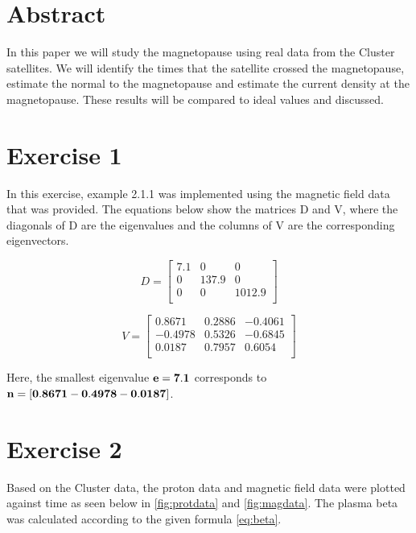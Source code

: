 \section*{Abstract}
In this paper we will study the magnetopause using real data from the Cluster satellites. We will identify the times that the satellite crossed the magnetopause, estimate the normal to the magnetopause and estimate the current density at the magnetopause. These results will be compared to ideal values and discussed.

\section*{Exercise 1}
	In this exercise, example 2.1.1 was implemented using the magnetic field data that was provided. The equations below show the matrices D and V, where the diagonals of D are the eigenvalues and the columns of V are the corresponding eigenvectors.
   \begin{multicols}{2}
    \begin{equation}
    	D =
    	\begin{bmatrix}
        	7.1 & 0 & 0 \\
             0  & 137.9 & 0 \\
             0  &  0 & 1012.9 \\
         \end{bmatrix}
     \end{equation}
     
     \begin{equation}
         V =
         \begin{bmatrix}
         	0.8671 & 0.2886 & -0.4061 \\
   			-0.4978 & 0.5326 & -0.6845 \\
    		 0.0187 & 0.7957 & 0.6054 \\
          \end{bmatrix}
      \end{equation}
    \end{multicols}
Here, the smallest eigenvalue $\bf{e} = 7.1$ corresponds to $\bf{n} = [0.8671 -0.4978 -0.0187]$.

\section*{Exercise 2}
	Based on the Cluster data, the proton data and magnetic field data were plotted against time as seen below in \ref{fig:protdata} and \ref{fig:magdata}. The plasma beta was calculated according to the given formula \ref{eq:beta}.
    
